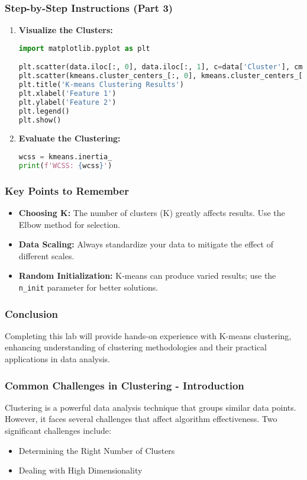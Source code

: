 \documentclass{beamer}
\begin{document}
\begin{frame}[fragile]
    \frametitle{Step-by-Step Instructions (Part 3)}
    \begin{enumerate}[resume]
        \item \textbf{Visualize the Clusters:}
        \begin{lstlisting}[language=python]
import matplotlib.pyplot as plt

plt.scatter(data.iloc[:, 0], data.iloc[:, 1], c=data['Cluster'], cmap='viridis')
plt.scatter(kmeans.cluster_centers_[:, 0], kmeans.cluster_centers_[:, 1], s=300, c='red', label='Centroids')
plt.title('K-means Clustering Results')
plt.xlabel('Feature 1')
plt.ylabel('Feature 2')
plt.legend()
plt.show()
        \end{lstlisting}

        \item \textbf{Evaluate the Clustering:}
        \begin{lstlisting}[language=python]
wcss = kmeans.inertia_
print(f'WCSS: {wcss}')
        \end{lstlisting}
    \end{enumerate}
\end{frame}

\begin{frame}[fragile]
    \frametitle{Key Points to Remember}
    \begin{itemize}
        \item \textbf{Choosing K:} The number of clusters (K) greatly affects results. Use the Elbow method for selection.
        \item \textbf{Data Scaling:} Always standardize your data to mitigate the effect of different scales.
        \item \textbf{Random Initialization:} K-means can produce varied results; use the \texttt{n\_init} parameter for better solutions.
    \end{itemize}
\end{frame}

\begin{frame}[fragile]
    \frametitle{Conclusion}
    Completing this lab will provide hands-on experience with K-means clustering, enhancing understanding of clustering methodologies and their practical applications in data analysis.
\end{frame}

\begin{frame}[fragile]
    \frametitle{Common Challenges in Clustering - Introduction}
    Clustering is a powerful data analysis technique that groups similar data points. However, it faces several challenges that affect algorithm effectiveness. Two significant challenges include:
    
    \begin{itemize}
        \item Determining the Right Number of Clusters
        \item Dealing with High Dimensionality
    \end{itemize}
\end{frame}
\end{document}
